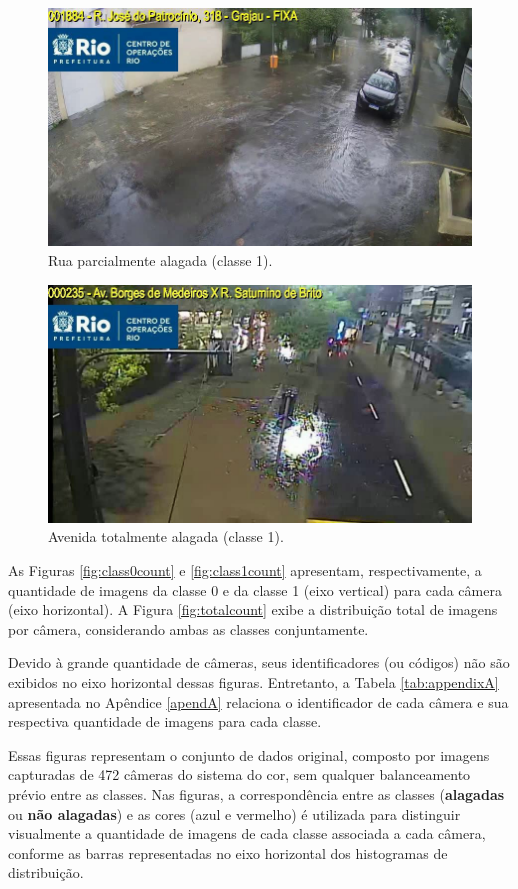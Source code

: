\begin{figure}[htb]
\centerline{\includegraphics[width=0.8\linewidth]{images/1/CODE1884 2023-08-20 12-56-29-9.jpg}}
\caption{Rua parcialmente alagada (classe 1).}
\label{fig:class1_1}
\end{figure}

\begin{figure}[htb]
\centerline{\includegraphics[width=0.8\linewidth]{images/1/CODE235 2023-02-07 20-11-08-9.jpg}}
\caption{Avenida totalmente alagada (classe 1).}
\label{fig:class1_2}
\end{figure}

As Figuras \ref{fig:class0count} e \ref{fig:class1count} apresentam, respectivamente, a quantidade de imagens da classe 0 e da classe 1 (eixo vertical) para cada câmera (eixo horizontal).
A Figura \ref{fig:totalcount} exibe a distribuição total de imagens por câmera, considerando ambas as classes conjuntamente.

Devido à grande quantidade de câmeras, seus identificadores (ou códigos) não são exibidos no eixo horizontal dessas figuras.
Entretanto, a Tabela \ref{tab:appendixA} apresentada no Apêndice \ref{apendA} relaciona o identificador de cada câmera e sua respectiva quantidade de imagens para cada classe.

Essas figuras representam o conjunto de dados original, composto por imagens capturadas de 472 câmeras do sistema do \acrshort{cor}, sem qualquer balanceamento prévio entre as classes.
Nas figuras, a correspondência entre as classes (\textbf{alagadas} ou \textbf{não alagadas}) e as cores (azul e vermelho) é utilizada para distinguir visualmente a quantidade de imagens de cada classe associada a cada câmera, conforme as barras representadas no eixo horizontal dos histogramas de distribuição.

